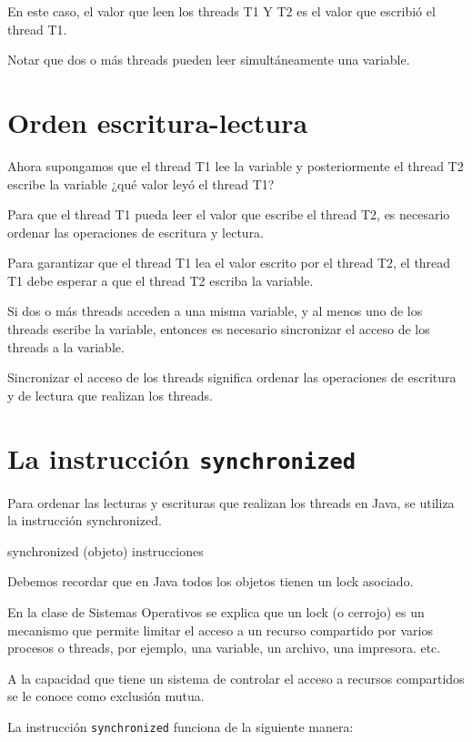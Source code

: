 \documentclass[11pt,a4paper,oneside]{book}
\begin{document}
En este caso, el valor que leen los threads T1 Y T2 es el valor que escribió el thread T1.

Notar que dos o más threads pueden leer simultáneamente una variable.

\section{Orden escritura-lectura}

Ahora supongamos que el thread T1 lee la variable y posteriormente el thread T2 escribe la variable ¿qué valor leyó el thread T1?

Para que el thread T1 pueda leer el valor que escribe el thread T2, es necesario ordenar las operaciones de escritura y lectura.

Para garantizar que el thread T1 lea el valor escrito por el thread T2, el thread T1 debe esperar a que el thread T2 escriba la variable.

Si dos o más threads acceden a una misma variable, y al menos uno de los threads escribe la variable, entonces es necesario sincronizar el acceso de los threads a la variable.

Sincronizar el acceso de los threads significa ordenar las operaciones de escritura y de lectura que realizan los threads.

\section{La instrucción \texttt{synchronized}}

Para ordenar las lecturas y escrituras que realizan los threads en Java, se utiliza la instrucción synchronized.

\begin{SourceCode}
synchronized (objeto)
{
  instrucciones
}
\end{SourceCode}

Debemos recordar que en Java todos los objetos tienen un lock asociado.

En la clase de Sistemas Operativos se explica que un lock (o cerrojo) es un mecanismo que permite limitar el acceso a un recurso compartido por varios procesos o threads, por ejemplo, una variable, un archivo, una impresora. etc. 

A la capacidad que tiene un sistema de controlar el acceso a recursos compartidos se le conoce como exclusión mutua.

La instrucción \texttt{synchronized} funciona de la siguiente manera:
\end{document}
